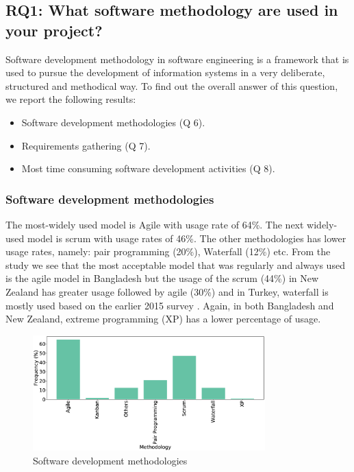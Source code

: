\subsection{RQ1: What software methodology are used in your project?}
\label{RQ1}
Software development methodology in software engineering is a framework that is used to pursue the development of information systems in a very deliberate, structured and methodical way. To find out the overall answer of this question, we report the following results:
\begin{itemize}
\item Software development methodologies (Q 6).
\item Requirements gathering (Q 7).
\item Most time consuming software development activities (Q 8).
\end{itemize}

\subsubsection{Software development methodologies}
The most-widely used model is Agile with usage rate of 64\%. The next widely-used model is scrum with usage rates of 46\%. The other methodologies has lower usage rates, namely: pair programming (20\%), Waterfall (12\%) etc. From the study we see that the most acceptable model that was regularly and always used is the agile model in Bangladesh but the usage of the scrum (44\%) in New Zealand has greater usage followed by agile (30\%) \cite{Wang2018} and in Turkey, waterfall is mostly used based on the earlier 2015 survey \cite{Garousi2015}. Again, in both Bangladesh and New Zealand, extreme programming (XP) has a lower percentage of usage.
\begin{figure}[htbp]
\centering
  \includegraphics[width=0.8\textwidth]{Figures/Respondents_Methodology}
  \caption{Software development methodologies}
  \label{fig:methodologies}
\end{figure}

